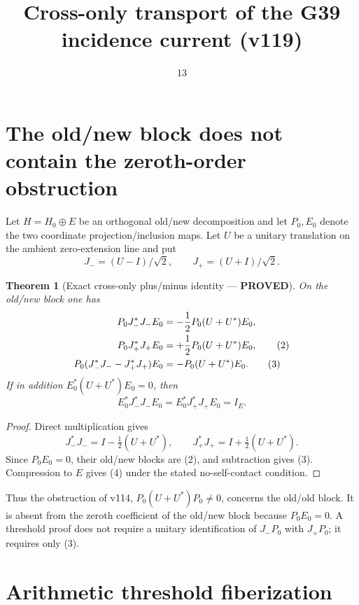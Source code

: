\documentclass[11pt]{article}
\title{Cross-only transport of the G39 incidence current (v119)}
\date{13}
\newcommand{\PROVED}{\textcolor{green!40!black}{\textbf{PROVED}}}
\newtheorem{theorem}{Theorem}
\begin{document}
\maketitle

\section{The old/new block does not contain the zeroth-order obstruction}

Let $H=H_0\oplus E$ be an orthogonal old/new decomposition and let
$P_0,E_0$ denote the two coordinate projection/inclusion maps.  Let $U$ be
a unitary translation on the ambient zero-extension line and put
\begin{equation}
 J_-=(U-I)/\sqrt2,\qquad J_+=(U+I)/\sqrt2.                    \tag{1}
\end{equation}

\begin{theorem}[Exact cross-only plus/minus identity --- \PROVED]
On the old/new block one has
\begin{align}
 P_0J_-^*J_-E_0&=-\frac12P_0(U+U^*)E_0,\notag\\
 P_0J_+^*J_+E_0&=+\frac12P_0(U+U^*)E_0,                     \tag{2}\\
 P_0(J_-^*J_--J_+^*J_+)E_0&=-P_0(U+U^*)E_0.                \tag{3}
\end{align}
If in addition $E_0^*(U+U^*)E_0=0$, then
\begin{equation}
 E_0^*J_-^*J_-E_0=E_0^*J_+^*J_+E_0=I_E.                   \tag{4}
\end{equation}
\end{theorem}

\begin{proof}
Direct multiplication gives
\[
 J_-^*J_-=I-\tfrac12(U+U^*),\qquad
 J_+^*J_+=I+\tfrac12(U+U^*).
\]
Since $P_0E_0=0$, their old/new blocks are (2), and subtraction gives
(3).  Compression to $E$ gives (4) under the stated no-self-contact
condition.
\end{proof}

Thus the obstruction of v114, $P_0(U+U^*)P_0\ne0$, concerns the old/old
block.  It is absent from the zeroth coefficient of the old/new block
because $P_0E_0=0$.  A threshold proof does not require a unitary
identification of $J_-P_0$ with $J_+P_0$; it requires only (3).

\section{Arithmetic threshold fiberization}
\end{document}

